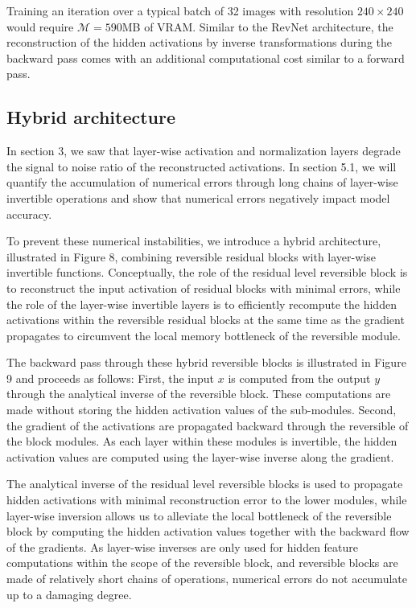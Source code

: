 \documentclass[twocolumn]{bmcart}
\begin{document}
Training an iteration over a typical batch of 32 images with resolution $240 \times 240$ would require $\mathcal{M}=590$MB of VRAM.
Similar to the RevNet architecture, the reconstruction of the hidden activations by inverse transformations during the backward pass comes with an additional computational cost similar to a forward pass.

\subsection{Hybrid architecture}

In section 3, we saw that layer-wise activation and normalization layers degrade the signal to noise ratio of the reconstructed activations.
In section 5.1, we will quantify the accumulation of numerical errors through long chains of layer-wise invertible operations and show that numerical errors negatively impact model accuracy.

To prevent these numerical instabilities, we introduce a hybrid architecture, illustrated in Figure 8, combining reversible residual blocks with layer-wise invertible functions.
Conceptually, the role of the residual level reversible block is to reconstruct the input activation of residual blocks with minimal errors,
while the role of the layer-wise invertible layers is to efficiently recompute the hidden activations within the reversible residual
blocks at the same time as the gradient propagates to circumvent the local memory bottleneck of the reversible module.

The backward pass through these hybrid reversible blocks is illustrated in Figure 9 and proceeds as follows:
First, the input $x$ is computed from the output $y$ through the analytical inverse of the reversible block.
These computations are made without storing the hidden activation values of the sub-modules.
Second, the gradient of the activations are propagated backward through the reversible of the block modules.
As each layer within these modules is invertible, the hidden activation values
are computed using the layer-wise inverse along the gradient.

The analytical inverse of the residual level reversible blocks is used to propagate hidden activations with minimal reconstruction error to the lower modules,
while layer-wise inversion allows us to alleviate the local bottleneck of the reversible block by computing the hidden activation values together with the backward flow of the gradients.
As layer-wise inverses are only used for hidden feature computations within the scope of the reversible block,
and reversible blocks are made of relatively short chains of operations,
numerical errors do not accumulate up to a damaging degree.
\end{document}
